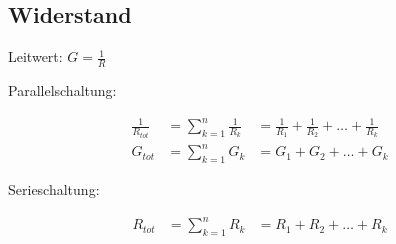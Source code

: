 \begin{sectionbox}
	\subsection{Widerstand}

	\begin{emphbox}
	Leitwert:	$ G = \frac{1}{R} $\\
	\end{emphbox}	
	
	Parallelschaltung:
	\begin{emphbox}
		\begin{align*}
			\frac{1}{R_{tot}} &= \sum _{k=1}^{n}\frac{1}{R_k} &= \frac{1}{R_{1}} + \frac{1}{R_{2}} + \ldots + \frac{1}{R_k}\\
			G_{tot} &= \sum _{k=1}^{n}G_k &= G_1 + G_2 + \ldots + G_k
		\end{align*}
	\end{emphbox}
	
	Serieschaltung:
	\begin{emphbox}
			\begin{align*}
			R_{tot} &= \sum _{k=1}^{n}R_k &= R_1 + R_2 + \ldots + R_k
		\end{align*}

	\end{emphbox}

	
\end{sectionbox}


